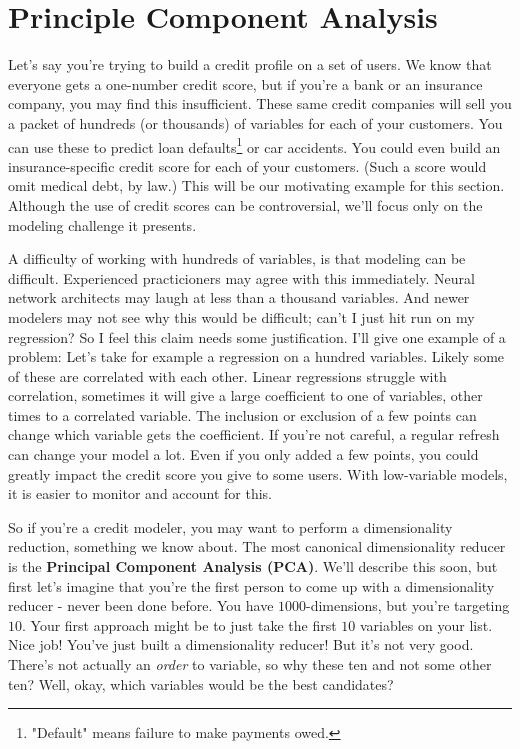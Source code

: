 \documentclass{amsbook}
\begin{document}
\section{Principle Component Analysis}\label{SectionPCA}

Let's say you're trying to build a credit profile on a set of users.  We know that everyone gets a one-number credit score, but if you're a bank or an insurance company, you may find this insufficient.  These same credit companies will sell you a packet of hundreds (or thousands) of variables for each of your customers.  You can use these to predict loan defaults\footnote{"Default" means failure to make payments owed.} or car accidents.  You could even build an insurance-specific credit score for each of your customers.  (Such a score would omit medical debt, by law.)  This will be our motivating example for this section.  Although the use of credit scores can be controversial, we'll focus only on the modeling challenge it presents.

A difficulty of working with hundreds of variables, is that modeling can be difficult.  Experienced practicioners may agree with this immediately.  Neural network architects may laugh at less than a thousand variables.  And newer modelers may not see why this would be difficult; can't I just hit run on my regression?  So I feel this claim needs some justification.  I'll give one example of a problem:  Let's take for example a regression on a hundred variables.  Likely some of these are correlated with each other.  Linear regressions struggle with correlation, sometimes it will give a large coefficient to one of variables, other times to a correlated variable.  The inclusion or exclusion of a few points can change which variable gets the coefficient.  If you're not careful, a regular refresh can change your model a lot.  Even if you only added a few points, you could greatly impact the credit score you give to some users.  With low-variable models, it is easier to monitor and account for this.

So if you're a credit modeler, you may want to perform a dimensionality reduction, something we know about.  The most canonical dimensionality reducer is the {\bf Principal Component Analysis (PCA)}.  We'll describe this soon, but first let's imagine that you're the first person to come up with a dimensionality reducer - never been done before.  You have $1000$-dimensions, but you're targeting $10$.  Your first approach might be to just take the first $10$ variables on your list.  Nice job!  You've just built a dimensionality reducer!  But it's not very good.  There's not actually an {\em order} to variable, so why these ten and not some other ten?  Well, okay, which variables would be the best candidates?
\end{document}
